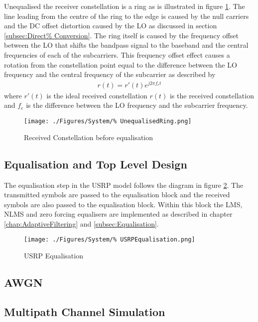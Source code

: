 Unequalised the receiver constellation is a ring as is %
illustrated in figure \ref{fig:ReceivedRing}. The line %
leading from the centre of the ring to the edge is %
caused by the null carriers and the DC offset distortion %
caused by the LO as discussed in section \ref{subsec:Direct%
Conversion}. The ring itself is caused by the frequency offset %
between the LO that shifts the bandpass signal to the baseband %
and the central frequencies of each of the subcarriers. This %
frequency offset effect causes a rotation from the constellation %
point equal to the difference between the LO frequency and the %
central frequency of the subcarrier as described by 
\begin{align}
	r(t) = r'(t)e^{j 2\pi f_{e}t}
\end{align}
where $r'(t)$ is the ideal received constellation $r(t)$ is %
the received constellation and $f_{e}$ is the difference %
between the LO frequency and the subcarrier frequency.
\begin{figure}[ht]
	\centering
	\texttt{[image: ./Figures/System/\%
	UnequalisedRing.png]}
	\caption{Received Constellation before equalisation}
	\label{fig:ReceivedRing}
\end{figure}
\FloatBarrier
\subsection{Equalisation and Top Level Design}
The equalisation step in the USRP model follows %
the diagram in figure \ref{fig:USRPEqualisation}. The transmitted %
symbols are passed to the equalisation block and the received %
symbols are also passed to the equalisation block. Within this block %
the LMS, NLMS and zero forcing equalisers are implemented as %
described in chapter \ref{chap:AdaptiveFiltering} and %
\ref{subsec:Equalisation}.
\begin{figure}[ht]
	\centering
	\texttt{[image: ./Figures/System/\%
	USRPEqualisation.png]}
	\caption{USRP Equalisation}
	\label{fig:USRPEqualisation}
\end{figure}
\subsection{AWGN}
\subsection{Multipath Channel Simulation}
